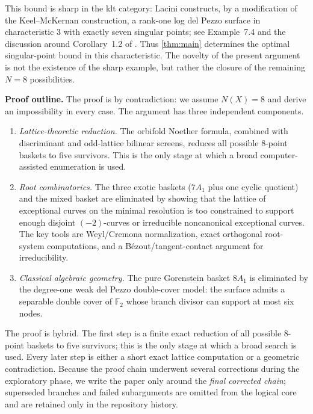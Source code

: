 \documentclass[11pt]{article}
\theoremstyle{definition}
\begin{document}
This bound is sharp in the klt category: Lacini constructs, by a modification of the Keel--McKernan construction, a rank-one log del Pezzo surface in characteristic $3$ with exactly seven singular points; see Example~7.4 and the discussion around Corollary~1.2 of \cite{Lacini24}. Thus \cref{thm:main} determines the optimal singular-point bound in this characteristic. The novelty of the present argument is not the existence of the sharp example, but rather the closure of the remaining $N=8$ possibilities.

\medskip
\noindent
\textbf{Proof outline.}
The proof is by contradiction: we assume $N(X)=8$ and derive an impossibility in every case.
The argument has three independent components.
\begin{enumerate}[label=\textup{(\arabic*)}]
\item\emph{Lattice-theoretic reduction.} The orbifold Noether formula, combined with discriminant and odd-lattice bilinear screens, reduces all possible $8$-point baskets to five survivors. This is the only stage at which a broad computer-assisted enumeration is used.
\item\emph{Root combinatorics.} The three exotic baskets ($7A_1$ plus one cyclic quotient) and the mixed basket are eliminated by showing that the lattice of exceptional curves on the minimal resolution is too constrained to support enough disjoint $(-2)$-curves or irreducible noncanonical exceptional curves. The key tools are Weyl/Cremona normalization, exact orthogonal root-system computations, and a B\'ezout/tangent-contact argument for irreducibility.
\item\emph{Classical algebraic geometry.} The pure Gorenstein basket $8A_1$ is eliminated by the degree-one weak del Pezzo double-cover model: the surface admits a separable double cover of $\mathbb F_2$ whose branch divisor can support at most six nodes.
\end{enumerate}

The proof is hybrid. The first step is a finite exact reduction of all possible $8$-point baskets to five survivors; this is the only stage at which a broad search is used. Every later step is either a short exact lattice computation or a geometric contradiction. Because the proof chain underwent several corrections during the exploratory phase, we write the paper only around the \emph{final corrected chain}; superseded branches and failed subarguments are omitted from the logical core and are retained only in the repository history.
\end{document}
